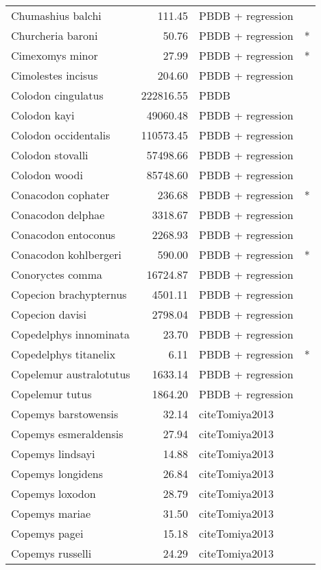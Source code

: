 \begin{table}[ht]
\begin{tabular}{lrll}
  Chumashius balchi & 111.45 & PBDB + regression &  \\ 
  Churcheria baroni & 50.76 & PBDB + regression & * \\ 
  Cimexomys minor & 27.99 & PBDB + regression & * \\ 
  Cimolestes incisus & 204.60 & PBDB + regression &  \\ 
  Colodon cingulatus & 222816.55 & PBDB &  \\ 
  Colodon kayi & 49060.48 & PBDB + regression &  \\ 
  Colodon occidentalis & 110573.45 & PBDB + regression &  \\ 
  Colodon stovalli & 57498.66 & PBDB + regression &  \\ 
  Colodon woodi & 85748.60 & PBDB + regression &  \\ 
  Conacodon cophater & 236.68 & PBDB + regression & * \\ 
  Conacodon delphae & 3318.67 & PBDB + regression &  \\ 
  Conacodon entoconus & 2268.93 & PBDB + regression &  \\ 
  Conacodon kohlbergeri & 590.00 & PBDB + regression & * \\ 
  Conoryctes comma & 16724.87 & PBDB + regression &  \\ 
  Copecion brachypternus & 4501.11 & PBDB + regression &  \\ 
  Copecion davisi & 2798.04 & PBDB + regression &  \\ 
  Copedelphys innominata & 23.70 & PBDB + regression &  \\ 
  Copedelphys titanelix & 6.11 & PBDB + regression & * \\ 
  Copelemur australotutus & 1633.14 & PBDB + regression &  \\ 
  Copelemur tutus & 1864.20 & PBDB + regression &  \\ 
  Copemys barstowensis & 32.14 & cite{Tomiya2013} &  \\ 
  Copemys esmeraldensis & 27.94 & cite{Tomiya2013} &  \\ 
  Copemys lindsayi & 14.88 & cite{Tomiya2013} &  \\ 
  Copemys longidens & 26.84 & cite{Tomiya2013} &  \\ 
  Copemys loxodon & 28.79 & cite{Tomiya2013} &  \\ 
  Copemys mariae & 31.50 & cite{Tomiya2013} &  \\ 
  Copemys pagei & 15.18 & cite{Tomiya2013} &  \\ 
  Copemys russelli & 24.29 & cite{Tomiya2013} &  \\ 

\end{tabular}
\end{table}
